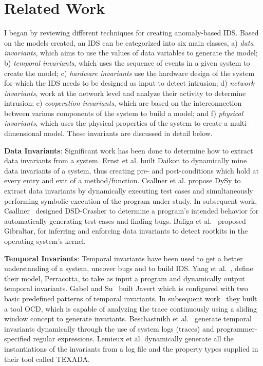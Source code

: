 
\chapter{Related Work}
\label{ch:RelatedWork}

I began by reviewing different techniques for creating anomaly-based IDS. Based on the models created, an IDS can be categorized into six main classes, a) \textit{data invariants}, which aims to use the values of data variables to generate the model; b) \textit{temporal invariants}, which uses the sequence of events in a given system to create the model; c) \textit{hardware invariants} use the hardware design of the system for which the IDS needs to be designed as input to detect intrusion; d) \textit{network invariants}, work at the network level and analyze their activity to determine intrusion; e) \textit{cooperation invariants}, which are based on the interconnection between various components of the system to build a model; and f) \textit{physical invariants}, which uses the physical properties of the system to create a multi-dimensional model. These invariants are discussed in detail below.

\textbf{Data Invariants}: Significant work \cite{ernst2007daikon, csallner2008dysy, baliga2008automatic, baliga2011detecting, csallner2008dsd} has been done to determine how to extract data invariants from a system. Ernst et al. \cite{ernst2007daikon} built Daikon to dynamically mine data invariants of a system, thus creating pre- and post-conditions which hold at every entry and exit of a method/function.  Csallner et al. \cite{csallner2008dysy} propose DySy to extract data invariants by dynamically executing test cases and simultaneously performing symbolic execution of the program under study. In subsequent work, Csallner~\cite{csallner2008dsd} designed DSD-Crasher to determine a program's intended behavior for automatically generating test cases and finding bugs.
Baliga et al.~\cite{baliga2008automatic, baliga2011detecting} proposed Gibraltar, for inferring and enforcing data invariants to detect rootkits in the operating system's kernel.  

\textbf{Temporal Invariants}: Temporal invariants have been used to get a better understanding of a system, uncover bugs and to build IDS. Yang et al.~\cite{yang2006perracotta}, define their model, Perracotta, to take as input a program and dynamically output temporal invariants. Gabel and Su~\cite{gabel2008javert} built Javert which is configured with two basic predefined patterns of temporal invariants. In subsequent work~\cite{gabel2010online} they built a tool OCD, which is capable of analyzing the trace continuously using a sliding window concept to generate invariants. Beschastnikh et al.~\cite{beschastnikh2011leveraging} generate temporal invariants dynamically through the use of system logs (traces) and programmer-specified regular expressions. Lemieux et al. \cite{lemieux2015general} dynamically generate all the instantiations of the invariants from a log file and the property types supplied in their tool called TEXADA. 

